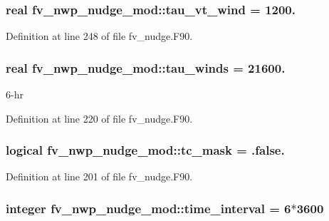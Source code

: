 \subsubsection[{tau\-\_\-vt\-\_\-wind}]{\setlength{\rightskip}{0pt plus 5cm}real fv\-\_\-nwp\-\_\-nudge\-\_\-mod\-::tau\-\_\-vt\-\_\-wind = 1200.\hspace{0.3cm}{\ttfamily [private]}}\label{classfv__nwp__nudge__mod_ac55edc6cc6a0dd38808a85de68d359ac}


Definition at line 248 of file fv\-\_\-nudge.\-F90.

\subsubsection[{tau\-\_\-winds}]{\setlength{\rightskip}{0pt plus 5cm}real fv\-\_\-nwp\-\_\-nudge\-\_\-mod\-::tau\-\_\-winds = 21600.\hspace{0.3cm}{\ttfamily [private]}}\label{classfv__nwp__nudge__mod_a8a91872ad260e59a51cee29ec3729d5f}


6-\/hr 



Definition at line 220 of file fv\-\_\-nudge.\-F90.

\subsubsection[{tc\-\_\-mask}]{\setlength{\rightskip}{0pt plus 5cm}logical fv\-\_\-nwp\-\_\-nudge\-\_\-mod\-::tc\-\_\-mask = .false.\hspace{0.3cm}{\ttfamily [private]}}\label{classfv__nwp__nudge__mod_a091b1c329569ecb6a515ebeb3a9050c6}


Definition at line 201 of file fv\-\_\-nudge.\-F90.

\subsubsection[{time\-\_\-interval}]{\setlength{\rightskip}{0pt plus 5cm}integer fv\-\_\-nwp\-\_\-nudge\-\_\-mod\-::time\-\_\-interval = 6$\ast$3600\hspace{0.3cm}{\ttfamily [private]}}\label{classfv__nwp__nudge__mod_a22a2c695dd1f7be9256ad520d57da7f6}


